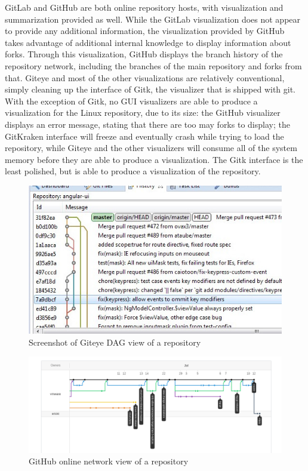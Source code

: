 GitLab and GitHub are both online repository hosts, with
visualization and summarization provided as well. While the GitLab
visualization does not appear to provide any additional information, the
visualization provided by GitHub takes advantage of additional internal
knowledge to display information about forks. Through this
visualization, GitHub displays the branch history of the repository
network, including the branches of the main repository and forks from
that. Giteye and most of the other visualizations are relatively
conventional, simply cleaning up the interface of Gitk, the visualizer
that is shipped with git. With the exception of Gitk, no GUI visualizers
are able to produce a visualization for the Linux repository, due to its
size: the GitHub visualizer displays an error message, stating that
there are too may forks to display; the GitKraken interface will freeze
and eventually crash while trying to load the repository, while Giteye
and the other visualizers will consume all of the system memory before
they are able to produce a visualization. The Gitk interface is the
least polished, but is able to produce a visualization of the
repository.

\begin{figure}[htpb]
  \centering
  \includegraphics[width=0.8\linewidth]{Figures/introduction/giteye_graph.jpg}
  \caption{Screenshot of Giteye DAG view of a repository}
  \label{fig:giteye_screenshot}
\end{figure}

\begin{figure}[htpb]
  \centering
  \includegraphics[width=0.8\linewidth]{Figures/introduction/github_dag.png}
  \caption{GitHub online network view of a repository}
  \label{fig:github_dag_screenshot}
\end{figure}

